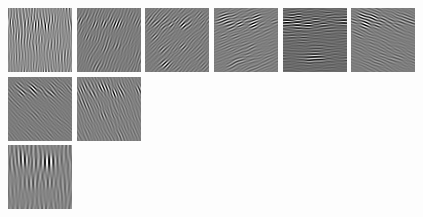 \begin{figure}
 \begin{center}
  \includegraphics[scale=0.5]{ch4/figures/real_-1_0.jpg}
  \includegraphics[scale=0.5]{ch4/figures/real_-1_1.jpg}
  \includegraphics[scale=0.5]{ch4/figures/real_-1_2.jpg}
  \includegraphics[scale=0.5]{ch4/figures/real_-1_3.jpg}
  \includegraphics[scale=0.5]{ch4/figures/real_-1_4.jpg}
  \includegraphics[scale=0.5]{ch4/figures/real_-1_5.jpg}
  \includegraphics[scale=0.5]{ch4/figures/real_-1_6.jpg}
  \includegraphics[scale=0.5]{ch4/figures/real_-1_7.jpg}\\
  \includegraphics[scale=0.5]{ch4/figures/real_0_0.jpg}

\end{center}
\end{figure}
